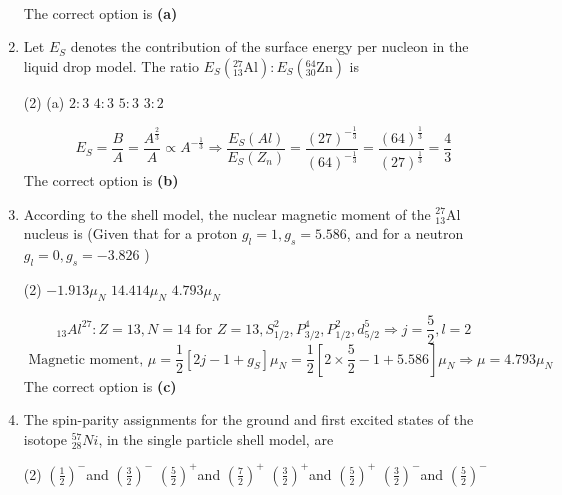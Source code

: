 \begin{enumerate}
\begin{answer}
\begin{align*}
	\end{align*}
	The correct option is \textbf{(a)}
\end{answer}
\item Let $E_{S}$ denotes the contribution of the surface energy per nucleon in the liquid drop model. The ratio $E_{S}\left({ }_{13}^{27} \mathrm{Al}\right): E_{S}\left({ }_{30}^{64} \mathrm{Zn}\right)$ is
{}
\begin{tasks}(2)
	\task[\textbf{A.}](a) $2: 3$
	\task[\textbf{B.}] $4: 3$
	\task[\textbf{C.}] $5: 3$
	\task[\textbf{D.}] $3: 2$
\end{tasks}
\begin{answer}
	$$E_{S}=\frac{B}{A}=\frac{A^{\frac{2}{3}}}{A} \propto A^{-\frac{1}{3}} \Rightarrow \frac{E_{S}(A l)}{E_{S}\left(Z_{n}\right)}=\frac{(27)^{-\frac{1}{3}}}{(64)^{-\frac{1}{3}}}=\frac{(64)^{\frac{1}{3}}}{(27)^{\frac{1}{3}}}=\frac{4}{3}$$
	The correct option is \textbf{(b)}
\end{answer}
\item According to the shell model, the nuclear magnetic moment of the ${ }_{13}^{27} \mathrm{Al}$ nucleus is (Given that for a proton $g_{l}=1, g_{s}=5.586$, and for a neutron $g_{l}=0, g_{s}=-3.826$ )
{}
\begin{tasks}(2)
	\task[\textbf{A.}] $-1.913 \mu_{N}$
	\task[\textbf{B.}]$14.414 \mu_{N}$
	\task[\textbf{C.}]$4.793 \mu_{N}$
\end{tasks}
\begin{answer}
$${ }_{13} A l^{27}: Z=13, N=14 \text { for } Z=13, S_{1 / 2}^{2}, P_{3 / 2}^{4}, P_{1 / 2}^{2}, d_{5 / 2}^{5} \Rightarrow j=\frac{5}{2}, l=2$$
$$
\text { Magnetic moment, } \mu=\frac{1}{2}\left[2 j-1+g_{S}\right] \mu_{N}=\frac{1}{2}\left[2 \times \frac{5}{2}-1+5.586\right] \mu_{N} \Rightarrow \mu=4.793 \mu_{N}
$$
The correct option is \textbf{(c)}	
\end{answer}
\item The spin-parity assignments for the ground and first excited states of the isotope ${ }_{28}^{57} N i$, in the single particle shell model, are
{}
\begin{tasks}(2)
	\task[\textbf{A.}] $\left(\frac{1}{2}\right)^{-}$and $\left(\frac{3}{2}\right)^{-}$
	\task[\textbf{B.}]$\left(\frac{5}{2}\right)^{+}$and $\left(\frac{7}{2}\right)^{+}$
	\task[\textbf{C.}]$\left(\frac{3}{2}\right)^{+}$and $\left(\frac{5}{2}\right)^{+}$
	\task[\textbf{D.}]$\left(\frac{3}{2}\right)^{-}$and $\left(\frac{5}{2}\right)^{-}$
\end{tasks}

\end{enumerate}
